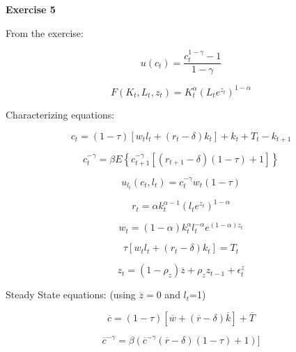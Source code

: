 \documentclass[letterpaper,12pt]{article}
\theoremstyle{definition}
\begin{document}
\noindent\textbf{Exercise 5}

From the exercise:

$$u\left(c_{t}\right) =\frac{c_{t}^{1-\gamma}-1}{1-\gamma}$$

$$F\left(K_{t}, L_{t}, z_{t}\right) =K_{t}^{\alpha}\left(L_{t} e^{z_{t}}\right)^{1-\alpha}$$

Characterizing equations:

\begin{equation}
  c_{t}=(1-\tau)\left[w_{t} l_{t}+\left(r_{t}-\delta\right) k_{t}\right]+k_{t}+T_{t}-k_{t+1}
\end{equation}

\begin{equation}
  c_{t}^{-\gamma}=\beta E\left\{c_{t+1}^{-\gamma}\left[\left(r_{t+1}-\delta\right)(1-\tau)+1\right]\right\}
\end{equation}

\begin{equation}
  u_{l_t}(c_t,l_t)=c_{t}^{-\gamma}w_t(1-\tau)
\end{equation}

\begin{equation}
  r_{t}=\alpha k_{t}^{\alpha-1}\left(l_t e^{z_{t}}\right)^{1-\alpha}
\end{equation}

\begin{equation}
  w_{t}=(1-\alpha) k_{t}^{\alpha} l_t^{-\alpha}e^{(1-\alpha) z_{t}}
\end{equation}

\begin{equation}
  \tau\left[w_{t} l_{t}+\left(r_{t}-\delta\right) k_{t}\right]=T_{t}
\end{equation}

\begin{equation}
  z_{t}=\left(1-\rho_{z}\right) \overline{z}+\rho_{z} z_{t-1}+\epsilon_{t}^{z}
\end{equation}

Steady State equations: (using $\overline{z}=0$ and $l_t$=1)

\begin{equation}
  \overline{c}=(1-\tau)[\overline{w}+(\overline{r}-\delta) \overline{k}]+\overline{T}
\end{equation}

\begin{equation}
  \overline{c}^{-\gamma}=\beta\left(\overline{c}^{-\gamma}(\overline{r}-\delta)(1-\tau)+1\right) ]
\end{equation}
\end{document}
